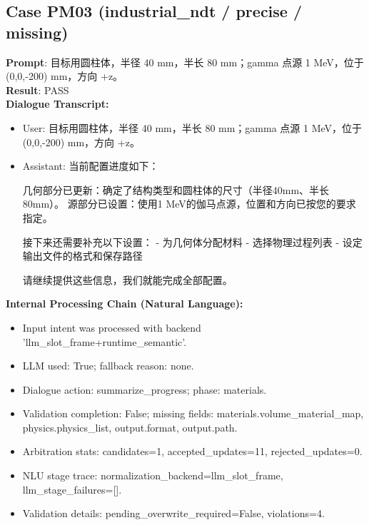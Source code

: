 \documentclass[11pt]{ctexart}
\begin{document}
\subsection{Case PM03 (industrial\_ndt / precise / missing)}
\textbf{Prompt}: 目标用圆柱体，半径 40 mm，半长 80 mm；gamma 点源 1 MeV，位于 (0,0,-200) mm，方向 +z。\\
\textbf{Result}: PASS\\
\textbf{Dialogue Transcript:}
\begin{itemize}
\item User: 目标用圆柱体，半径 40 mm，半长 80 mm；gamma 点源 1 MeV，位于 (0,0,-200) mm，方向 +z。
\item Assistant: 当前配置进度如下：

几何部分已更新：确定了结构类型和圆柱体的尺寸（半径40mm、半长80mm）。  
源部分已设置：使用1 MeV的伽马点源，位置和方向已按您的要求指定。  

接下来还需要补充以下设置：  
- 为几何体分配材料  
- 选择物理过程列表  
- 设定输出文件的格式和保存路径  

请继续提供这些信息，我们就能完成全部配置。
\end{itemize}
\textbf{Internal Processing Chain (Natural Language):}
\begin{itemize}
\item Input intent was processed with backend 'llm\_slot\_frame+runtime\_semantic'.
\item LLM used: True; fallback reason: none.
\item Dialogue action: summarize\_progress; phase: materials.
\item Validation completion: False; missing fields: materials.volume\_material\_map, physics.physics\_list, output.format, output.path.
\item Arbitration stats: candidates=1, accepted\_updates=11, rejected\_updates=0.
\item NLU stage trace: normalization\_backend=llm\_slot\_frame, llm\_stage\_failures=[].
\item Validation details: pending\_overwrite\_required=False, violations=4.
\end{itemize}
\end{document}
